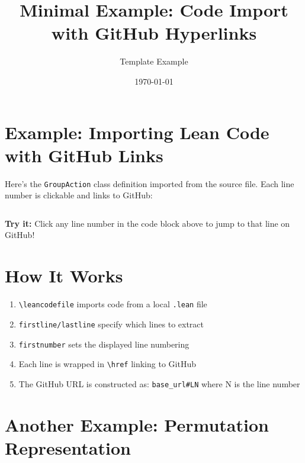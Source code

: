 \documentclass{article}
\newcommand{\leancodeurl}{}
\newcommand{\setleancodeurl}[1]{\renewcommand{\leancodeurl}{#1}}
\newcommand{\leancodefile}[3][]{%
  \setleancodeurl{#3}%
  \inputminted[fontsize=\footnotesize,breaklines,breakanywhere,tabsize=2,showspaces=false,linenos=true,#1]{lean4}{#2}%
}
\begin{document}
\title{Minimal Example: Code Import with GitHub Hyperlinks}
\author{Template Example}
\date{\today}
\maketitle

\section{Example: Importing Lean Code with GitHub Links}

Here's the \texttt{GroupAction} class definition imported from the source file.
Each line number is clickable and links to GitHub:

\leancodefile[
	firstline=20,
	lastline=23,
	firstnumber=20
]{../lean/GroupAction/Defs.lean}{https://github.com/FrankieeW/GroupAction/lean/GroupAction/Defs.lean}

\textbf{Try it:} Click any line number in the code block above to jump to that line on GitHub!

\section{How It Works}

\begin{enumerate}
	\item \texttt{\textbackslash leancodefile} imports code from a local \texttt{.lean} file
	\item \texttt{firstline/lastline} specify which lines to extract
	\item \texttt{firstnumber} sets the displayed line numbering
	\item Each line is wrapped in \texttt{\textbackslash href} linking to GitHub
	\item The GitHub URL is constructed as: \texttt{base\_url\#LN} where N is the line number
\end{enumerate}

\section{Another Example: Permutation Representation}

\leancodefile[
	firstline=66,
	lastline=69,
	firstnumber=66
]{../lean/GroupAction/Permutation.lean}{https://github.com/FrankieeW/GroupAction/lean/GroupAction/Permutation.lean}
\end{document}
